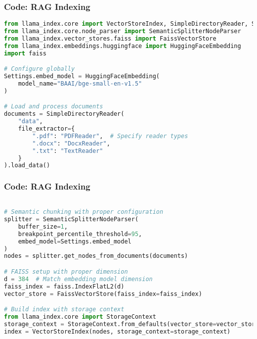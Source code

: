 \begin{frame}[fragile]\frametitle{Code: RAG Indexing}
    \begin{lstlisting}[language=Python, basicstyle=\tiny, caption={llm\_llamaindex\_rag.py - Building the Index}]
from llama_index.core import VectorStoreIndex, SimpleDirectoryReader, Settings
from llama_index.core.node_parser import SemanticSplitterNodeParser
from llama_index.vector_stores.faiss import FaissVectorStore
from llama_index.embeddings.huggingface import HuggingFaceEmbedding
import faiss

# Configure globally
Settings.embed_model = HuggingFaceEmbedding(
    model_name="BAAI/bge-small-en-v1.5"
)

# Load and process documents
documents = SimpleDirectoryReader(
    "data",
    file_extractor={
        ".pdf": "PDFReader",  # Specify reader types
        ".docx": "DocxReader",
        ".txt": "TextReader"
    }
).load_data()

    \end{lstlisting}
\end{frame}

\begin{frame}[fragile]\frametitle{Code: RAG Indexing}
    \begin{lstlisting}[language=Python, basicstyle=\tiny, caption={llm\_llamaindex\_rag.py - Building the Index}]

# Semantic chunking with proper configuration
splitter = SemanticSplitterNodeParser(
    buffer_size=1,
    breakpoint_percentile_threshold=95,
    embed_model=Settings.embed_model
)
nodes = splitter.get_nodes_from_documents(documents)

# FAISS setup with proper dimension
d = 384  # Match embedding model dimension
faiss_index = faiss.IndexFlatL2(d)
vector_store = FaissVectorStore(faiss_index=faiss_index)

# Build index with storage context
from llama_index.core import StorageContext
storage_context = StorageContext.from_defaults(vector_store=vector_store)
index = VectorStoreIndex(nodes, storage_context=storage_context)
    \end{lstlisting}
\end{frame}


